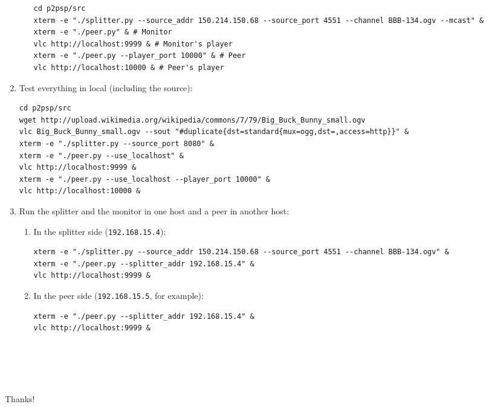 \documentclass{article}
\begin{document}
\begin{enumerate}
\begin{enumerate}
\begin{verbatim}
cd p2psp/src
xterm -e "./splitter.py --source_addr 150.214.150.68 --source_port 4551 --channel BBB-134.ogv --mcast" &
xterm -e "./peer.py" & # Monitor
vlc http://localhost:9999 & # Monitor's player
xterm -e "./peer.py --player_port 10000" & # Peer
vlc http://localhost:10000 & # Peer's player
\end{verbatim}

\end{enumerate}

\item Test everything in local (including the source):

\begin{verbatim}
cd p2psp/src
wget http://upload.wikimedia.org/wikipedia/commons/7/79/Big_Buck_Bunny_small.ogv
vlc Big_Buck_Bunny_small.ogv --sout "#duplicate{dst=standard{mux=ogg,dst=,access=http}}" &
xterm -e "./splitter.py --source_port 8080" &
xterm -e "./peer.py --use_localhost" &
vlc http://localhost:9999 &
xterm -e "./peer.py --use_localhost --player_port 10000" &
vlc http://localhost:10000 &
\end{verbatim}

\item Run the splitter and the monitor in one host and a peer in another host:

\begin{enumerate}
\item In the splitter side ({\tt 192.168.15.4}):

\begin{verbatim}
xterm -e "./splitter.py --source_addr 150.214.150.68 --source_port 4551 --channel BBB-134.ogv" &
xterm -e "./peer.py --splitter_addr 192.168.15.4" &
vlc http://localhost:9999 &
\end{verbatim}

\item In the peer side ({\tt 192.168.15.5}, for example):
\begin{verbatim}
xterm -e "./peer.py --splitter_addr 192.168.15.4" &
vlc http://localhost:9999 &
\end{verbatim}

\end{enumerate}

\end{enumerate}


\part*{}

\begin{center}
~\\
~\\
~\\
\Huge{Thanks!}
~\\
~\\
~\\
~\\
\end{center}


\end{document}
